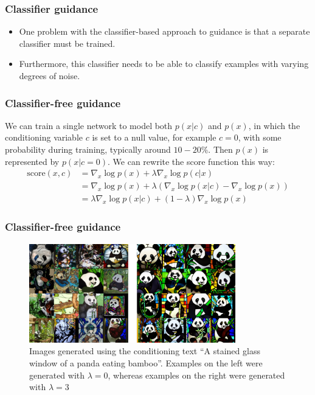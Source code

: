 \documentclass{beamer}
\begin{document}
\begin{frame}
    \frametitle{Classifier guidance}
    \begin{itemize}
        \item One problem with the classifier-based approach to guidance is that a separate classifier must be trained.
        \item Furthermore, this classifier needs to be able to classify examples with varying degrees of noise.
    \end{itemize}
\end{frame}

\begin{frame}
    \frametitle{Classifier-free guidance}
    We can train a single network to model both $p(x|c)$ and $p(x)$, in which the conditioning variable $c$ is set to a null value, for example $c=0$, with some probability during training, typically around $10-20\%$. Then $p(x)$ is represented by $p(x|c=0)$. We can rewrite the score function this way:
    \begin{align*}
        \mathrm{score}(x,c)&=\nabla_{x}\log{}p(x)+\lambda\nabla_{x}\log{}p(c|x) \\
        &=\nabla_{x}\log{}p(x)+\lambda(\nabla_{x}\log{}p(x|c)-\nabla_{x}\log{}p(x)) \\
        &=\lambda\nabla_{x}\log{}p(x|c)+(1-\lambda)\nabla_{x}\log{}p(x)
    \end{align*}
\end{frame}

\begin{frame}
    \frametitle{Classifier-free guidance}
    \begin{figure}
        \caption{Images generated using the conditioning text ``A stained glass window of a panda eating bamboo''. Examples on the left were generated with $\lambda=0$, whereas examples on the right were generated with $\lambda=3$}
        \includegraphics[width=0.8\textwidth]{Figure_7.pdf}
    \end{figure}
\end{frame}
\end{document}
